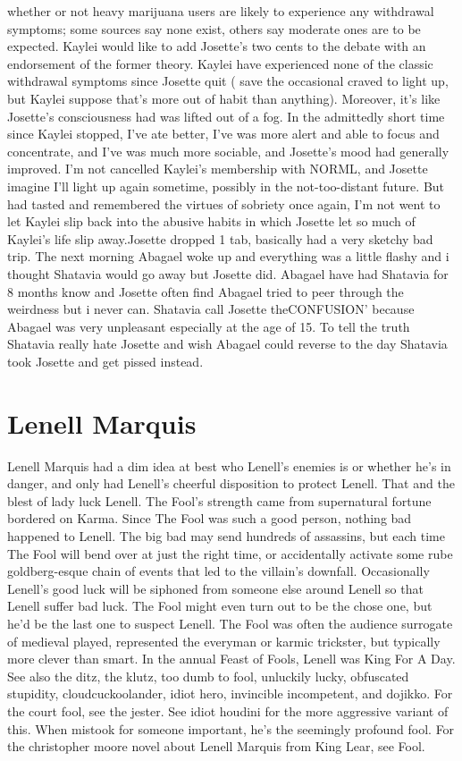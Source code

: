 \documentclass[12pt]{book}
\begin{document}
whether or not heavy marijuana users are likely to experience any withdrawal symptoms; some sources say none exist, others say moderate ones are to be expected. Kaylei would like to add Josette's two cents to the debate with an endorsement of the former theory. Kaylei have experienced none of the classic withdrawal symptoms since Josette quit ( save the occasional craved to light up, but Kaylei suppose that's more out of habit than anything). Moreover, it's like Josette's consciousness had was lifted out of a fog. In the admittedly short time since Kaylei stopped, I've ate better, I've was more alert and able to focus and concentrate, and I've was much more sociable, and Josette's mood had generally improved. I'm not cancelled Kaylei's membership with NORML, and Josette imagine I'll light up again sometime, possibly in the not-too-distant future. But had tasted and remembered the virtues of sobriety once again, I'm not went to let Kaylei slip back into the abusive habits in which Josette let so much of Kaylei's life slip away.Josette dropped 1 tab, basically had a very sketchy bad trip. The next morning Abagael woke up and everything was a little flashy and i thought Shatavia would go away but Josette did. Abagael have had Shatavia for 8 months know and Josette often find Abagael tried to peer through the weirdness but i never can. Shatavia call Josette theCONFUSION' because Abagael was very unpleasant especially at the age of 15. To tell the truth Shatavia really hate Josette and wish Abagael could reverse to the day Shatavia took Josette and get pissed instead.



\chapter{Lenell Marquis}

Lenell Marquis had a dim idea at best who Lenell's enemies is or whether he's in danger, and only had Lenell's cheerful disposition to protect Lenell. That and the blest of lady luck Lenell. The Fool's strength came from supernatural fortune bordered on Karma. Since The Fool was such a good person, nothing bad happened to Lenell. The big bad may send hundreds of assassins, but each time The Fool will bend over at just the right time, or accidentally activate some rube goldberg-esque chain of events that led to the villain's downfall. Occasionally Lenell's good luck will be siphoned from someone else around Lenell so that Lenell suffer bad luck. The Fool might even turn out to be the chose one, but he'd be the last one to suspect Lenell. The Fool was often the audience surrogate of medieval played, represented the everyman or karmic trickster, but typically more clever than smart. In the annual Feast of Fools, Lenell was King For A Day. See also the ditz, the klutz, too dumb to fool, unluckily lucky, obfuscated stupidity, cloudcuckoolander, idiot hero, invincible incompetent, and dojikko. For the court fool, see the jester. See idiot houdini for the more aggressive variant of this. When mistook for someone important, he's the seemingly profound fool. For the christopher moore novel about Lenell Marquis from King Lear, see Fool.
\end{document}
